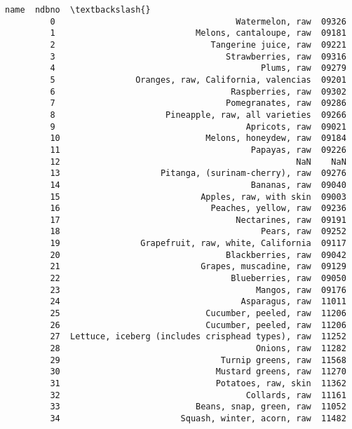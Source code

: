 \documentclass[11pt]{article}
\begin{document}
\begin{Verbatim}[commandchars=\\\{\}]
                                                         name  ndbno  \textbackslash{}
         0                                    Watermelon, raw  09326   
         1                            Melons, cantaloupe, raw  09181   
         2                               Tangerine juice, raw  09221   
         3                                  Strawberries, raw  09316   
         4                                         Plums, raw  09279   
         5                Oranges, raw, California, valencias  09201   
         6                                   Raspberries, raw  09302   
         7                                  Pomegranates, raw  09286   
         8                      Pineapple, raw, all varieties  09266   
         9                                      Apricots, raw  09021   
         10                             Melons, honeydew, raw  09184   
         11                                      Papayas, raw  09226   
         12                                               NaN    NaN   
         13                    Pitanga, (surinam-cherry), raw  09276   
         14                                      Bananas, raw  09040   
         15                            Apples, raw, with skin  09003   
         16                              Peaches, yellow, raw  09236   
         17                                   Nectarines, raw  09191   
         18                                        Pears, raw  09252   
         19                Grapefruit, raw, white, California  09117   
         20                                 Blackberries, raw  09042   
         21                            Grapes, muscadine, raw  09129   
         22                                  Blueberries, raw  09050   
         23                                       Mangos, raw  09176   
         24                                    Asparagus, raw  11011   
         25                             Cucumber, peeled, raw  11206   
         26                             Cucumber, peeled, raw  11206   
         27  Lettuce, iceberg (includes crisphead types), raw  11252   
         28                                       Onions, raw  11282   
         29                                Turnip greens, raw  11568   
         30                               Mustard greens, raw  11270   
         31                               Potatoes, raw, skin  11362   
         32                                     Collards, raw  11161   
         33                           Beans, snap, green, raw  11052   
         34                        Squash, winter, acorn, raw  11482   

\end{Verbatim}
\end{document}
